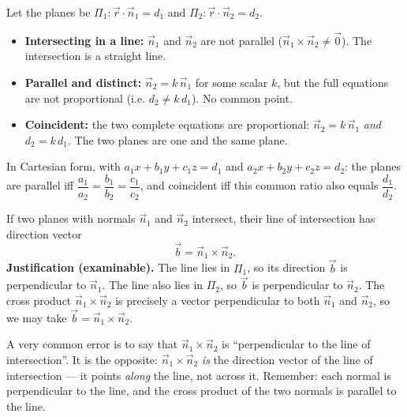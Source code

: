 \documentclass[11pt]{article}
\begin{document}
\begin{propriete}
Let the planes be $\Pi_1: \vec{r}\cdot\vec{n}_1 = d_1$ and $\Pi_2: \vec{r}\cdot\vec{n}_2 = d_2$.
\begin{itemize}
\item \textbf{Intersecting in a line:} $\vec{n}_1$ and $\vec{n}_2$ are not parallel ($\vec{n}_1 \times \vec{n}_2 \neq \vec{0}$). The intersection is a straight line.
\item \textbf{Parallel and distinct:} $\vec{n}_2 = k\,\vec{n}_1$ for some scalar $k$, but the full equations are not proportional (i.e. $d_2 \neq k\,d_1$). No common point.
\item \textbf{Coincident:} the two complete equations are proportional: $\vec{n}_2 = k\,\vec{n}_1$ \emph{and} $d_2 = k\,d_1$. The two planes are one and the same plane.
\end{itemize}
In Cartesian form, with $a_1x+b_1y+c_1z=d_1$ and $a_2x+b_2y+c_2z=d_2$: the planes are parallel iff $\dfrac{a_1}{a_2}=\dfrac{b_1}{b_2}=\dfrac{c_1}{c_2}$, and coincident iff this common ratio also equals $\dfrac{d_1}{d_2}$.
\end{propriete}

\begin{propriete}
If two planes with normals $\vec{n}_1$ and $\vec{n}_2$ intersect, their line of intersection has direction vector
\[ \vec{b} = \vec{n}_1 \times \vec{n}_2. \]
\textbf{Justification (examinable).} The line lies in $\Pi_1$, so its direction $\vec{b}$ is perpendicular to $\vec{n}_1$. The line also lies in $\Pi_2$, so $\vec{b}$ is perpendicular to $\vec{n}_2$. The cross product $\vec{n}_1 \times \vec{n}_2$ is precisely a vector perpendicular to both $\vec{n}_1$ and $\vec{n}_2$, so we may take $\vec{b} = \vec{n}_1 \times \vec{n}_2$.
\end{propriete}

\begin{attention}
A very common error is to say that $\vec{n}_1 \times \vec{n}_2$ is ``perpendicular to the line of intersection''. It is the opposite: $\vec{n}_1 \times \vec{n}_2$ \emph{is} the direction vector of the line of intersection — it points \emph{along} the line, not across it. Remember: each normal is perpendicular to the line, and the cross product of the two normals is parallel to the line.
\end{attention}
\end{document}
